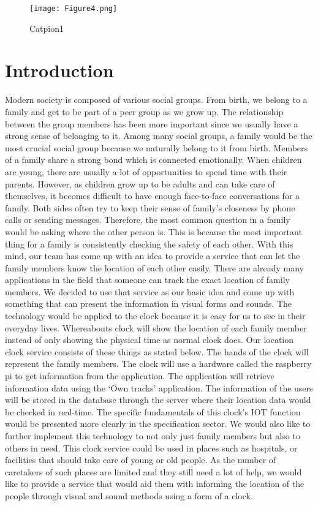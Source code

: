 \documentclass[10pt,a4paper,twocolumn]{report}
\begin{document}
\begin{figure}[h]
		\texttt{[image: Figure4.png]}
		\caption{Catpion1}
		\label{fig1}
\end{figure} 

\section{Introduction}
	Modern society is composed of various social groups. From birth, we belong to a family and get to be part of a peer group as we grow up. The relationship between the group members has been more important since we usually have a strong sense of belonging to it. Among many social groups, a family would be the most crucial social group because we naturally belong to it from birth. 
     Members of a family share a strong bond which is connected emotionally. When children are young, there are usually a lot of opportunities to spend time with their parents. However, as children grow up to be adults and can take care of themselves, it becomes difficult to have enough face-to-face conversations for a family. Both sides often try to keep their sense of family’s closeness by phone calls or sending messages. Therefore, the most common question in a family would be asking where the other person is. This is because the most important thing for a family is consistently checking the safety of each other. 
     With this mind, our team has come up with an idea to provide a service that can let the family members know the location of each other easily. There are already many applications in the field that someone can track the exact location of family members. We decided to use that service as our basic idea and come up with something that can present the information in visual forms and sounds. The technology would be applied to the clock because it is easy for us to see in their everyday lives. Whereabouts clock will show the location of each family member instead of only showing the physical time as normal clock does. 
     Our location clock service consists of these things as stated below. The hands of the clock will represent the family members. The clock will use a hardware called the raspberry pi to get information from the application. The application will retrieve information data using the ‘Own tracks’ application. The information of the users will be stored in the database through the server where their location data would be checked in real-time. The specific fundamentals of this clock’s IOT function would be presented more clearly in the specification sector. 
     We would also like to further implement this technology to not only just family members but also to others in need. This clock service could be used in places such as hospitals, or facilities that should take care of young or old people. As the number of caretakers of such places are limited and they still need a lot of help, we would like to provide a service that would aid them with informing the location of the people through visual and sound methods using a form of a clock.
     
\end{document}
